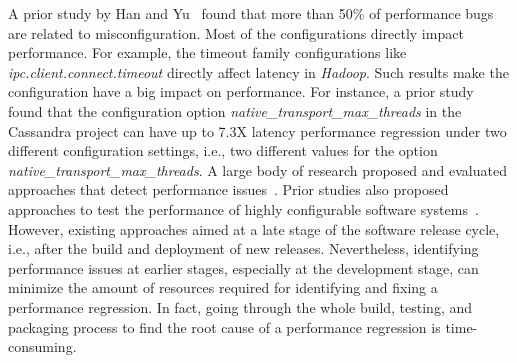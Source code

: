 A prior study by Han and Yu~\cite{RN2864} found that more than 50\% of performance bugs are related to misconfiguration. Most of the configurations directly impact performance. For example, the timeout family configurations like \emph{ipc.client.connect.timeout} directly affect latency in \emph{Hadoop}. Such results make the configuration have a big impact on performance. For instance, a prior study~\cite{DBLP:conf/eurosys/LiWHL20} found that the configuration option \emph{native\_transport\_max\_threads} in the Cassandra project can have up to 7.3X latency performance regression under two different configuration settings, i.e., two different values for the option  \emph{native\_transport\_max\_threads}. 
A large body of research proposed and evaluated approaches that detect performance issues~\cite{Nguyen:2012:ADP,nguyen2011automated,Nguyen:2014:ICS,foo2010mining,DBLP:conf/icse/FooJAHZF15}. Prior studies also proposed approaches to test the performance of highly configurable software systems~\cite{DBLP:journals/dt/SaxenaFHMYM00,wu2010performance,DBLP:journals/ese/HalinNADPB19}. However, existing approaches aimed at a late stage of the software release cycle, i.e., after the build and deployment of new releases. Nevertheless, identifying performance issues at earlier stages, especially at the development stage, can minimize the amount of resources required for identifying and fixing a performance regression. In fact, going through the whole build, testing, and packaging process to find the root cause of a performance regression is time-consuming. %




